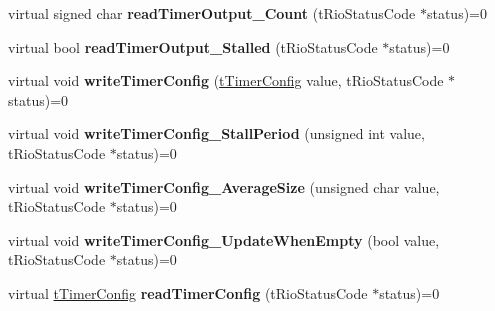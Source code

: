 \begin{DoxyCompactItemize}
\item 
\hypertarget{classnFPGA_1_1nFRC__2012__1__6__4_1_1tCounter_a33838e37449a10c3a0ff7f8e32ca8db4}{
virtual signed char {\bfseries readTimerOutput\_\-Count} (tRioStatusCode $\ast$status)=0}
\label{classnFPGA_1_1nFRC__2012__1__6__4_1_1tCounter_a33838e37449a10c3a0ff7f8e32ca8db4}

\item 
\hypertarget{classnFPGA_1_1nFRC__2012__1__6__4_1_1tCounter_a4e0af0c1eaa730cd8ae8430799ca9d42}{
virtual bool {\bfseries readTimerOutput\_\-Stalled} (tRioStatusCode $\ast$status)=0}
\label{classnFPGA_1_1nFRC__2012__1__6__4_1_1tCounter_a4e0af0c1eaa730cd8ae8430799ca9d42}

\item 
\hypertarget{classnFPGA_1_1nFRC__2012__1__6__4_1_1tCounter_a2571c9b4071dbae9b34de9900983787f}{
virtual void {\bfseries writeTimerConfig} (\hyperlink{unionnFPGA_1_1nFRC__2012__1__6__4_1_1tCounter_1_1tTimerConfig}{tTimerConfig} value, tRioStatusCode $\ast$status)=0}
\label{classnFPGA_1_1nFRC__2012__1__6__4_1_1tCounter_a2571c9b4071dbae9b34de9900983787f}

\item 
\hypertarget{classnFPGA_1_1nFRC__2012__1__6__4_1_1tCounter_ac605b1caff2f1168f5f5666911e660f5}{
virtual void {\bfseries writeTimerConfig\_\-StallPeriod} (unsigned int value, tRioStatusCode $\ast$status)=0}
\label{classnFPGA_1_1nFRC__2012__1__6__4_1_1tCounter_ac605b1caff2f1168f5f5666911e660f5}

\item 
\hypertarget{classnFPGA_1_1nFRC__2012__1__6__4_1_1tCounter_a47ab313193c39faf54c4f3f106ea8720}{
virtual void {\bfseries writeTimerConfig\_\-AverageSize} (unsigned char value, tRioStatusCode $\ast$status)=0}
\label{classnFPGA_1_1nFRC__2012__1__6__4_1_1tCounter_a47ab313193c39faf54c4f3f106ea8720}

\item 
\hypertarget{classnFPGA_1_1nFRC__2012__1__6__4_1_1tCounter_aaaea9a17264e260007bc717a1a093a6f}{
virtual void {\bfseries writeTimerConfig\_\-UpdateWhenEmpty} (bool value, tRioStatusCode $\ast$status)=0}
\label{classnFPGA_1_1nFRC__2012__1__6__4_1_1tCounter_aaaea9a17264e260007bc717a1a093a6f}

\item 
\hypertarget{classnFPGA_1_1nFRC__2012__1__6__4_1_1tCounter_a2871656fbeca2f2fbe143d2bc0b5e937}{
virtual \hyperlink{unionnFPGA_1_1nFRC__2012__1__6__4_1_1tCounter_1_1tTimerConfig}{tTimerConfig} {\bfseries readTimerConfig} (tRioStatusCode $\ast$status)=0}
\label{classnFPGA_1_1nFRC__2012__1__6__4_1_1tCounter_a2871656fbeca2f2fbe143d2bc0b5e937}


\end{DoxyCompactItemize}
